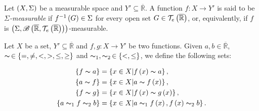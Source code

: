 \begin{definition}
  Let $\left(X,\Sigma\right)$ be a measurable space and $Y'\subseteq\overline{\mathbb{R}}$. A function $f:X\rightarrow Y'$ is said to be \emph{$\Sigma$-measurable} if $f^{-1}\left(G\right)\in\Sigma$ for every open set $G\in\mathcal{T}_e\left(\overline{\mathbb{R}}\right)$, or, equivalently, if $f$ is $\left(\Sigma,\mathscr{B}\left(\mathbb{\overline{R}},\mathcal{T}_e\left(\overline{\mathbb{R}}\right)\right)\right)$-measurable.
\end{definition}

Let $X$ be a set, $Y'\subseteq\overline{\mathbb{R}}$ and $f,g:X\rightarrow Y'$ be two functions. Given $a,b\in\overline{\mathbb{R}}$, $\thicksim\,\in\left\{=,\neq,<,>,\leq,\geq\right\}$ and $\thicksim_1,\thicksim_2\,\in\left\{<,\leq\right\}$, we define the following sets:

\begin{equation}
    \begin{split}
      \left\{f\thicksim a\right\} & =\left\{x\in X\middle| f\left(x\right)\thicksim a\right\},\\
      \left\{a\thicksim f\right\} & =\left\{x\in X\middle| a\thicksim f\left(x\right)\right\},\\
      \left\{f\thicksim g\right\} & =\left\{x\in X\middle| f\left(x\right)\thicksim g\left(x\right)\right\},\\
      \left\{a\thicksim_1 f\thicksim_2 b\right\} & =\left\{x\in X\middle| a\thicksim_1 f\left(x\right),f\left(x\right)\thicksim_2 b\right\}.
    \end{split}
\end{equation}

